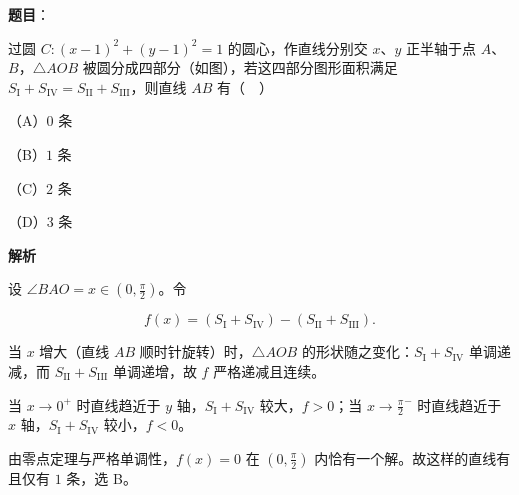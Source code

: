 \begin{answer}

\textbf{题目}：

过圆 $C:(x-1)^2+(y-1)^2=1$ 的圆心，作直线分别交 $x$、$y$ 正半轴于点 $A$、$B$，$\triangle AOB$ 被圆分成四部分（如图），若这四部分图形面积满足 $S_{\mathrm I}+S_{\mathrm{IV}}=S_{\mathrm{II}}+S_{\mathrm{III}}$，则直线 $AB$ 有（　）
\nopagebreak[4]
\begin{center}\end{center}
\nopagebreak[4]
（A）$0$ 条

（B）$1$ 条

（C）$2$ 条

（D）$3$ 条

\textbf{解析}

设 $\angle BAO=x\in\left(0,\frac\pi2\right)$。令

\nopagebreak[4]
\[f(x)=(S_{\mathrm I}+S_{\mathrm{IV}})-(S_{\mathrm{II}}+S_{\mathrm{III}}).\]

当 $x$ 增大（直线 $AB$ 顺时针旋转）时，$\triangle AOB$ 的形状随之变化：$S_{\mathrm I}+S_{\mathrm{IV}}$ 单调递减，而 $S_{\mathrm{II}}+S_{\mathrm{III}}$ 单调递增，故 $f$ 严格递减且连续。

当 $x\to0^+$ 时直线趋近于 $y$ 轴，$S_{\mathrm I}+S_{\mathrm{IV}}$ 较大，$f>0$；当 $x\to\frac\pi2^-$ 时直线趋近于 $x$ 轴，$S_{\mathrm I}+S_{\mathrm{IV}}$ 较小，$f<0$。

由零点定理与严格单调性，$f(x)=0$ 在 $\left(0,\frac\pi2\right)$ 内恰有一个解。故这样的直线有且仅有 $1$ 条，选 B。


\end{answer}
